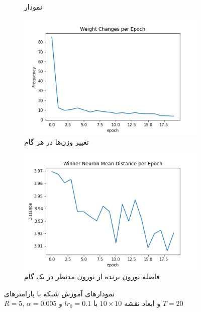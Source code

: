 \documentclass[12pt, a4paper]{article}
\begin{document}
\begin{figure}[h]
\begin{subfigure}{0.45\linewidth}
        \caption{نمودار }
    \end{subfigure}
    \newline
    \begin{subfigure}{0.45\linewidth}
        \includegraphics[width=\linewidth]{images/q5/r13/weight_change.png}
        \caption{تغییر وزن‌ها در هر گام}
    \end{subfigure}
    \hfill
    \begin{subfigure}{0.45\linewidth}
        \includegraphics[width=\linewidth]{images/q5/r13/winner_distance.png}
        \caption{فاصله نورون برنده از نورون مدنظر در یک گام}
    \end{subfigure}
    \caption{نمودار‌های آموزش شبکه  با پارامتر‌های \\$R=5$, $\alpha=0.005$ و ابعاد نقشه $10 \times 10$ با $lr_0=0.1$ و $T=20$}
    \label{r13}
\end{figure}
\end{document}
